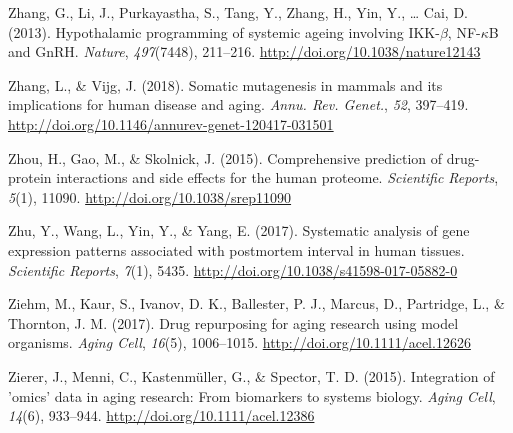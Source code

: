 \documentclass[12pt,twoside]{unicam}
\begin{document}
\begin{cslreferences}
\leavevmode\hypertarget{ref-Zhang2013}{}%
Zhang, G., Li, J., Purkayastha, S., Tang, Y., Zhang, H., Yin, Y., \ldots{} Cai, D. (2013). Hypothalamic programming of systemic ageing involving IKK-\(\beta\), NF-\(\kappa\)B and GnRH. \emph{Nature}, \emph{497}(7448), 211--216. \url{http://doi.org/10.1038/nature12143}

\leavevmode\hypertarget{ref-Zhang2018}{}%
Zhang, L., \& Vijg, J. (2018). Somatic mutagenesis in mammals and its implications for human disease and aging. \emph{Annu. Rev. Genet.}, \emph{52}, 397--419. \url{http://doi.org/10.1146/annurev-genet-120417-031501}

\leavevmode\hypertarget{ref-Zhou2015}{}%
Zhou, H., Gao, M., \& Skolnick, J. (2015). Comprehensive prediction of drug-protein interactions and side effects for the human proteome. \emph{Scientific Reports}, \emph{5}(1), 11090. \url{http://doi.org/10.1038/srep11090}

\leavevmode\hypertarget{ref-Zhu2017}{}%
Zhu, Y., Wang, L., Yin, Y., \& Yang, E. (2017). Systematic analysis of gene expression patterns associated with postmortem interval in human tissues. \emph{Scientific Reports}, \emph{7}(1), 5435. \url{http://doi.org/10.1038/s41598-017-05882-0}

\leavevmode\hypertarget{ref-Ziehm2017}{}%
Ziehm, M., Kaur, S., Ivanov, D. K., Ballester, P. J., Marcus, D., Partridge, L., \& Thornton, J. M. (2017). Drug repurposing for aging research using model organisms. \emph{Aging Cell}, \emph{16}(5), 1006--1015. \url{http://doi.org/10.1111/acel.12626}

\leavevmode\hypertarget{ref-Zierer2015}{}%
Zierer, J., Menni, C., Kastenmüller, G., \& Spector, T. D. (2015). Integration of 'omics' data in aging research: From biomarkers to systems biology. \emph{Aging Cell}, \emph{14}(6), 933--944. \url{http://doi.org/10.1111/acel.12386}
\end{cslreferences}
\end{document}
